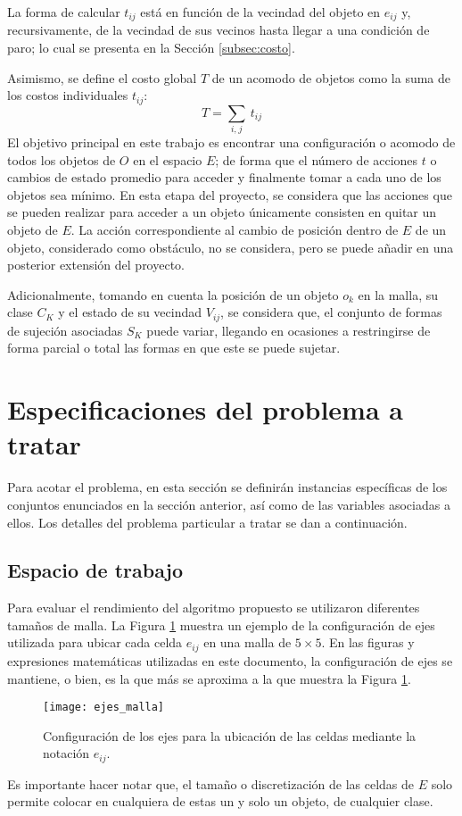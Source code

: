La forma de calcular $t_{ij}$ está en función de la vecindad del objeto en $e_{ij}$ y, recursivamente, de la vecindad de sus vecinos hasta llegar a una condición de paro; lo cual se presenta en la Sección \ref{subsec:costo}.

Asimismo, se define el costo global $T$ de un acomodo de objetos como la suma de los costos individuales $t_{ij}$:
%
\begin{equation}
\label{eq:costo_global}
	T = \sum_{i,\hspace{1pt} j}\ t_{ij}
\end{equation}
%
El objetivo principal en este trabajo es encontrar una configuración o acomodo de todos los objetos de $O$ en el espacio $E$; de forma que el número de acciones $t$ o cambios de estado promedio para acceder y finalmente tomar a cada uno de los objetos sea mínimo.
En esta etapa del proyecto, se considera que las acciones que se pueden realizar para acceder a un objeto únicamente consisten en quitar un objeto de $E$.
La acción correspondiente al cambio de posición dentro de $E$ de un objeto, considerado como obstáculo, no se considera, pero se puede añadir en una posterior extensión del proyecto.

Adicionalmente, tomando en cuenta la posición de un objeto $o_k$ en la malla, su clase $C_K$ y el estado de su vecindad $V_{ij}$, se considera que, el conjunto de formas de sujeción asociadas $S_K$ puede variar, llegando en ocasiones a restringirse de forma parcial o total las formas en que este se puede sujetar.
%
%
\section{Especificaciones del problema a tratar}
\label{sec:especificaciones}
%
%
Para acotar el problema, en esta sección se definirán instancias específicas de los conjuntos enunciados en la sección anterior, así como de las variables asociadas a ellos. 
Los detalles del problema particular a tratar se dan a continuación.
%
%
\subsection{Espacio de trabajo}
\label{subsec:espacio_trabajo}
%
%
Para evaluar el rendimiento del algoritmo propuesto se utilizaron diferentes tamaños de malla.
La Figura \ref{fig:ejes_malla} muestra un ejemplo de la configuración de ejes utilizada para ubicar cada celda $e_{ij}$ en una malla de $5\times 5$.
En las figuras y expresiones matemáticas utilizadas en este documento, la configuración de ejes se mantiene, o bien, es la que más se aproxima a la que muestra la Figura \ref{fig:ejes_malla}.
%
\begin{figure}[H]
	\texttt{[image: ejes\_malla]}%
	\caption{Configuración de los ejes para la ubicación de las celdas mediante la notación $e_{ij}$.}%
	\label{fig:ejes_malla}%
\end{figure}
%
Es importante hacer notar que, el tamaño o discretización de las celdas de $E$ solo permite colocar en cualquiera de estas un y solo un objeto, de cualquier clase.
%
%
